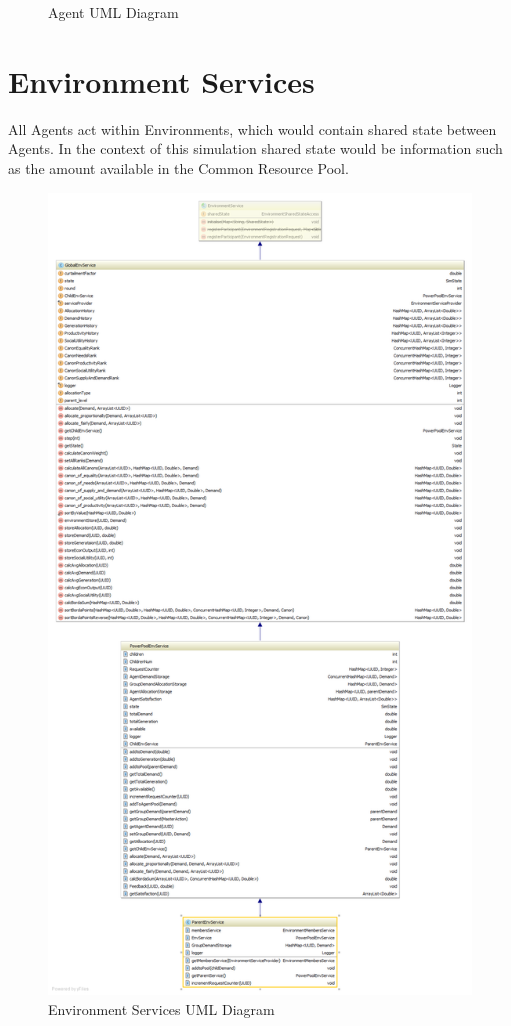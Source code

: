 \begin{figure}[!h]
	\caption{Agent UML Diagram}
	\label{fig:AgentUML}
\end{figure}

\section*{Environment Services}
All Agents act within Environments, which would contain shared state between Agents. In the context of this simulation shared state would be information such as the amount available in the Common Resource Pool.

\begin{figure}[!h]
	\centering
	\includegraphics[scale=0.3]{Images/EnvironmentUML.png}
	\caption{Environment Services UML Diagram}
	\label{fig:ServiceUML}
\end{figure}

